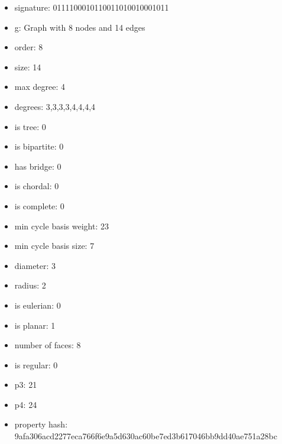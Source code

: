 \begin{itemize}
\item signature: 0111100010110011010010001011
\item g: Graph with 8 nodes and 14 edges
\item order: 8
\item size: 14
\item max degree: 4
\item degrees: 3,3,3,3,4,4,4,4
\item is tree: 0
\item is bipartite: 0
\item has bridge: 0
\item is chordal: 0
\item is complete: 0
\item min cycle basis weight: 23
\item min cycle basis size: 7
\item diameter: 3
\item radius: 2
\item is eulerian: 0
\item is planar: 1
\item number of faces: 8
\item is regular: 0
\item p3: 21
\item p4: 24
\item property hash: 9afa306acd2277eca766f6e9a5d630ac60be7ed3b617046bb9dd40ae751a28bc
\end{itemize}
\newpage
\begin{figure}
\end{figure}
